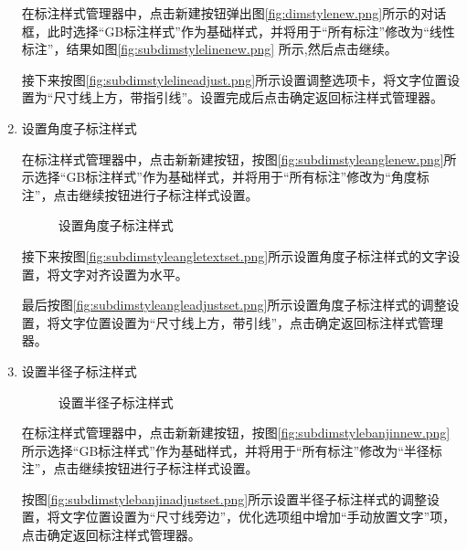 \begin{procedure}
\begin{enumerate}
在标注样式管理器中，点击新建按钮弹出图\ref{fig:dimstylenew.png}所示的对话框，此时选择“GB标注样式”作为基础样式，并将用于“所有标注”修改为“线性标注”，结果如图\ref{fig:subdimstylelinenew.png} 所示,然后点击继续。

接下来按图\ref{fig:subdimstylelineadjust.png}所示设置调整选项卡，将文字位置设置为“尺寸线上方，带指引线”。设置完成后点击确定返回标注样式管理器。

\item 设置角度子标注样式

在标注样式管理器中，点击新新建按钮，按图\ref{fig:subdimstyleanglenew.png}所示选择“GB标注样式”作为基础样式，并将用于“所有标注”修改为“角度标注”，点击继续按钮进行子标注样式设置。

\begin{figure}[htbp]
\centering
{}\hspace{10pt}
\hspace{10pt}
\caption{设置角度子标注样式}
\end{figure}

接下来按图\ref{fig:subdimstyleangletextset.png}所示设置角度子标注样式的文字设置，将文字对齐设置为水平。

最后按图\ref{fig:subdimstyleangleadjustset.png}所示设置角度子标注样式的调整设置，将文字位置设置为“尺寸线上方，带引线”，点击确定返回标注样式管理器。
\item 设置半径子标注样式

\begin{figure}[htbp]
\centering
{}\hspace{20pt}
\caption{设置半径子标注样式}
\end{figure}

在标注样式管理器中，点击新新建按钮，按图\ref{fig:subdimstylebanjinnew.png}所示选择“GB标注样式”作为基础样式，并将用于“所有标注”修改为“半径标注”，点击继续按钮进行子标注样式设置。

按图\ref{fig:subdimstylebanjinadjustset.png}所示设置半径子标注样式的调整设置，将文字位置设置为“尺寸线旁边”，优化选项组中增加“手动放置文字”项，点击确定返回标注样式管理器。


\end{enumerate}
\end{procedure}
